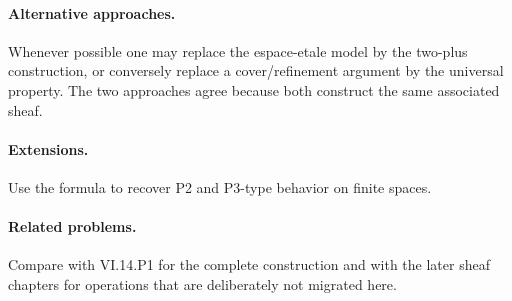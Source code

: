 \paragraph{Alternative approaches.}
Whenever possible one may replace the espace-etale model by the two-plus construction, or conversely replace a cover/refinement argument by the universal property.  The two approaches agree because both construct the same associated sheaf.

\paragraph{Extensions.}
Use the formula to recover P2 and P3-type behavior on finite spaces.

\paragraph{Related problems.}
Compare with VI.14.P1 for the complete construction and with the later sheaf chapters for operations that are deliberately not migrated here.
\fi
